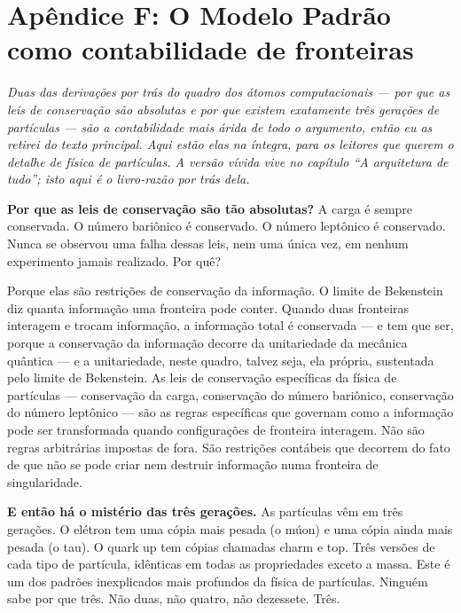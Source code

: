 \documentclass[11pt, twoside, openright]{book}
\begin{document}
\chapter*{Apêndice F: O Modelo Padrão como contabilidade de fronteiras}

\textit{Duas das derivações por trás do quadro dos átomos computacionais --- por que as leis de conservação são absolutas e por que existem exatamente três gerações de partículas --- são a contabilidade mais árida de todo o argumento, então eu as retirei do texto principal. Aqui estão elas na íntegra, para os leitores que querem o detalhe de física de partículas. A versão vívida vive no capítulo ``A arquitetura de tudo''; isto aqui é o livro-razão por trás dela.}

\textbf{Por que as leis de conservação são tão absolutas?} A carga é sempre conservada. O número bariônico é conservado. O número leptônico é conservado. Nunca se observou uma falha dessas leis, nem uma única vez, em nenhum experimento jamais realizado. Por quê?

Porque elas são restrições de conservação da informação. O limite de Bekenstein diz quanta informação uma fronteira pode conter. Quando duas fronteiras interagem e trocam informação, a informação total é conservada --- e tem que ser, porque a conservação da informação decorre da unitariedade da mecânica quântica --- e a unitariedade, neste quadro, talvez seja, ela própria, sustentada pelo limite de Bekenstein. As leis de conservação específicas da física de partículas --- conservação da carga, conservação do número bariônico, conservação do número leptônico --- são as regras específicas que governam como a informação pode ser transformada quando configurações de fronteira interagem. Não são regras arbitrárias impostas de fora. São restrições contábeis que decorrem do fato de que não se pode criar nem destruir informação numa fronteira de singularidade.

\textbf{E então há o mistério das três gerações.} As partículas vêm em três gerações. O elétron tem uma cópia mais pesada (o múon) e uma cópia ainda mais pesada (o tau). O quark up tem cópias chamadas charm e top. Três versões de cada tipo de partícula, idênticas em todas as propriedades exceto a massa. Este é um dos padrões inexplicados mais profundos da física de partículas. Ninguém sabe por que três. Não duas, não quatro, não dezessete. Três.
\end{document}

